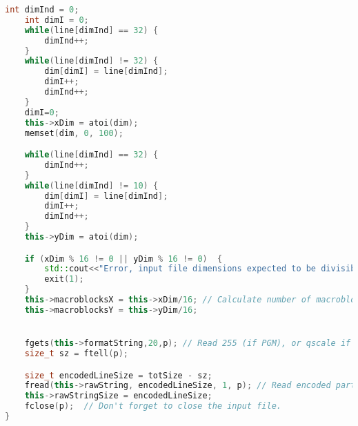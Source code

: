 \documentclass{report}
\begin{document}
\begin{lstlisting}[language=C++]
    int dimInd = 0;
    int dimI = 0;
    while(line[dimInd] == 32) {
        dimInd++;
    }
    while(line[dimInd] != 32) {
        dim[dimI] = line[dimInd];
        dimI++;
        dimInd++;
    }
    dimI=0;
    this->xDim = atoi(dim);
    memset(dim, 0, 100);

    while(line[dimInd] == 32) {
        dimInd++;
    }
    while(line[dimInd] != 10) {
        dim[dimI] = line[dimInd];
        dimI++;
        dimInd++;
    }
    this->yDim = atoi(dim);

    if (xDim % 16 != 0 || yDim % 16 != 0)  {
        std::cout<<"Error, input file dimensions expected to be divisible by 16\n";
        exit(1);
    }
    this->macroblocksX = this->xDim/16; // Calculate number of macroblocks
    this->macroblocksY = this->yDim/16;


    fgets(this->formatString,20,p); // Read 255 (if PGM), or qscale if (DCT)
    size_t sz = ftell(p);

    size_t encodedLineSize = totSize - sz;
    fread(this->rawString, encodedLineSize, 1, p); // Read encoded part in binary.
    this->rawStringSize = encodedLineSize;
    fclose(p);  // Don't forget to close the input file.
}
\end{lstlisting}
\end{document}
